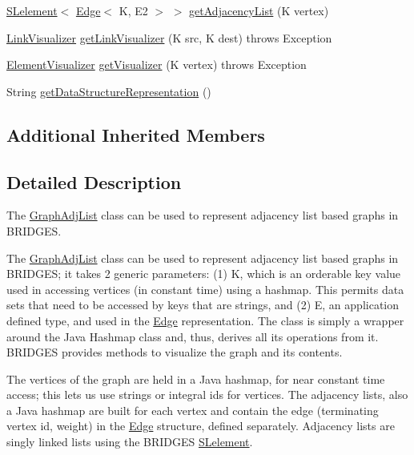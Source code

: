 \begin{DoxyCompactItemize}
\item 
\mbox{\hyperlink{classbridges_1_1base_1_1_s_lelement}{S\+Lelement}}$<$ \mbox{\hyperlink{classbridges_1_1base_1_1_edge}{Edge}}$<$ K, E2 $>$ $>$ \mbox{\hyperlink{classbridges_1_1base_1_1_graph_adj_list_aa8d25bc56b9a172999f0c62ee7e04b6f}{get\+Adjacency\+List}} (K vertex)
\item 
\mbox{\hyperlink{classbridges_1_1base_1_1_link_visualizer}{Link\+Visualizer}} \mbox{\hyperlink{classbridges_1_1base_1_1_graph_adj_list_af93888dbd2a768a2401619ad5dc95560}{get\+Link\+Visualizer}} (K src, K dest)  throws Exception 
\item 
\mbox{\hyperlink{classbridges_1_1base_1_1_element_visualizer}{Element\+Visualizer}} \mbox{\hyperlink{classbridges_1_1base_1_1_graph_adj_list_aafb45833cd5c13b6ce9bdece3fefde6a}{get\+Visualizer}} (K vertex)  throws Exception 
\item 
String \mbox{\hyperlink{classbridges_1_1base_1_1_graph_adj_list_a9bba66056cdf24197c41fff455e19a6c}{get\+Data\+Structure\+Representation}} ()
\end{DoxyCompactItemize}
\subsection*{Additional Inherited Members}


\subsection{Detailed Description}
The \mbox{\hyperlink{classbridges_1_1base_1_1_graph_adj_list}{Graph\+Adj\+List}} class can be used to represent adjacency list based graphs in B\+R\+I\+D\+G\+ES. 

The \mbox{\hyperlink{classbridges_1_1base_1_1_graph_adj_list}{Graph\+Adj\+List}} class can be used to represent adjacency list based graphs in B\+R\+I\+D\+G\+ES; it takes 2 generic parameters\+: (1) K, which is an orderable key value used in accessing vertices (in constant time) using a hashmap. This permits data sets that need to be accessed by keys that are strings, and (2) E, an application defined type, and used in the \mbox{\hyperlink{classbridges_1_1base_1_1_edge}{Edge}} representation. The class is simply a wrapper around the Java Hashmap class and, thus, derives all its operations from it. B\+R\+I\+D\+G\+ES provides methods to visualize the graph and its contents.

The vertices of the graph are held in a Java hashmap, for near constant time access; this lets us use strings or integral ids for vertices. The adjacency lists, also a Java hashmap are built for each vertex and contain the edge (terminating vertex id, weight) in the \mbox{\hyperlink{classbridges_1_1base_1_1_edge}{Edge}} structure, defined separately. Adjacency lists are singly linked lists using the B\+R\+I\+D\+G\+ES \mbox{\hyperlink{classbridges_1_1base_1_1_s_lelement}{S\+Lelement}}.

